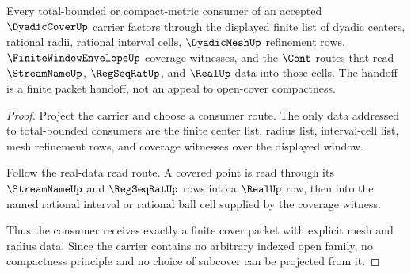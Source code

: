 \begin{theorem}
\label{thm:dyadic-cover-total-bounded-handoff}
Every total-bounded or compact-metric consumer of an accepted
$\DyadicCoverUp$ carrier factors through the displayed finite list of dyadic
centers, rational radii, rational interval cells, $\DyadicMeshUp$ refinement
rows, $\FiniteWindowEnvelopeUp$ coverage witnesses, and the $\Cont$ routes
that read $\StreamNameUp$, $\RegSeqRatUp$, and $\RealUp$ data into those cells.
The handoff is a finite packet handoff, not an appeal to open-cover compactness.
\end{theorem}
\begin{proof}
Project the carrier and choose a consumer route. The only data addressed to
total-bounded consumers are the finite center list, radius list, interval-cell
list, mesh refinement rows, and coverage witnesses over the displayed window.

Follow the real-data read route. A covered point is read through its
$\StreamNameUp$ and $\RegSeqRatUp$ rows into a $\RealUp$ row, then into the
named rational interval or rational ball cell supplied by the coverage
witness.

Thus the consumer receives exactly a finite cover packet with explicit mesh
and radius data. Since the carrier contains no arbitrary indexed open family,
no compactness principle and no choice of subcover can be projected from it.
\end{proof}

